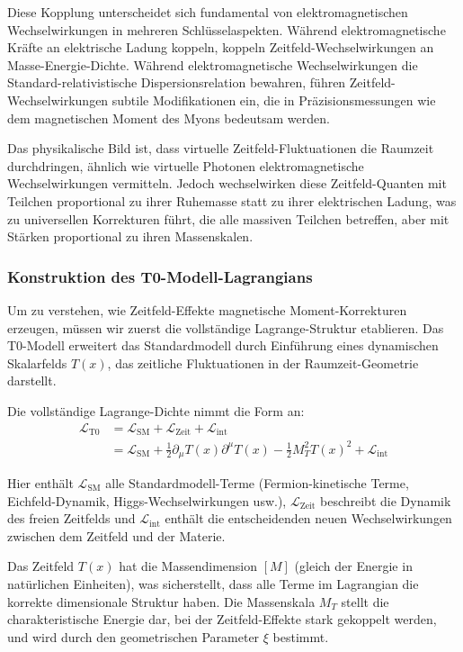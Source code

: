 \documentclass[12pt,a4paper]{article}
\newcommand{\Tfield}{T(x)}
\newcommand{\xipar}{\xi}
\begin{document}
	Diese Kopplung unterscheidet sich fundamental von elektromagnetischen Wechselwirkungen in mehreren Schlüsselaspekten. Während elektromagnetische Kräfte an elektrische Ladung koppeln, koppeln Zeitfeld-Wechselwirkungen an Masse-Energie-Dichte. Während elektromagnetische Wechselwirkungen die Standard-relativistische Dispersionsrelation bewahren, führen Zeitfeld-Wechselwirkungen subtile Modifikationen ein, die in Präzisionsmessungen wie dem magnetischen Moment des Myons bedeutsam werden.
	
	Das physikalische Bild ist, dass virtuelle Zeitfeld-Fluktuationen die Raumzeit durchdringen, ähnlich wie virtuelle Photonen elektromagnetische Wechselwirkungen vermitteln. Jedoch wechselwirken diese Zeitfeld-Quanten mit Teilchen proportional zu ihrer Ruhemasse statt zu ihrer elektrischen Ladung, was zu universellen Korrekturen führt, die alle massiven Teilchen betreffen, aber mit Stärken proportional zu ihren Massenskalen.
	
	\subsubsection{Konstruktion des T0-Modell-Lagrangians}
	
	Um zu verstehen, wie Zeitfeld-Effekte magnetische Moment-Korrekturen erzeugen, müssen wir zuerst die vollständige Lagrange-Struktur etablieren. Das T0-Modell erweitert das Standardmodell durch Einführung eines dynamischen Skalarfelds $\Tfield$, das zeitliche Fluktuationen in der Raumzeit-Geometrie darstellt.
	
	Die vollständige Lagrange-Dichte nimmt die Form an:
	\begin{align}
		\mathcal{L}_{\text{T0}} &= \mathcal{L}_{\text{SM}} + \mathcal{L}_{\text{Zeit}} + \mathcal{L}_{\text{int}} \\
		&= \mathcal{L}_{\text{SM}} + \frac{1}{2}\partial_{\mu} \Tfield \partial^{\mu} \Tfield - \frac{1}{2}M_T^2 \Tfield^2 + \mathcal{L}_{\text{int}}
	\end{align}
	
	Hier enthält $\mathcal{L}_{\text{SM}}$ alle Standardmodell-Terme (Fermion-kinetische Terme, Eichfeld-Dynamik, Higgs-Wechselwirkungen usw.), $\mathcal{L}_{\text{Zeit}}$ beschreibt die Dynamik des freien Zeitfelds und $\mathcal{L}_{\text{int}}$ enthält die entscheidenden neuen Wechselwirkungen zwischen dem Zeitfeld und der Materie.
	
	Das Zeitfeld $\Tfield$ hat die Massendimension $[M]$ (gleich der Energie in natürlichen Einheiten), was sicherstellt, dass alle Terme im Lagrangian die korrekte dimensionale Struktur haben. Die Massenskala $M_T$ stellt die charakteristische Energie dar, bei der Zeitfeld-Effekte stark gekoppelt werden, und wird durch den geometrischen Parameter $\xipar$ bestimmt.
	
\end{document}

